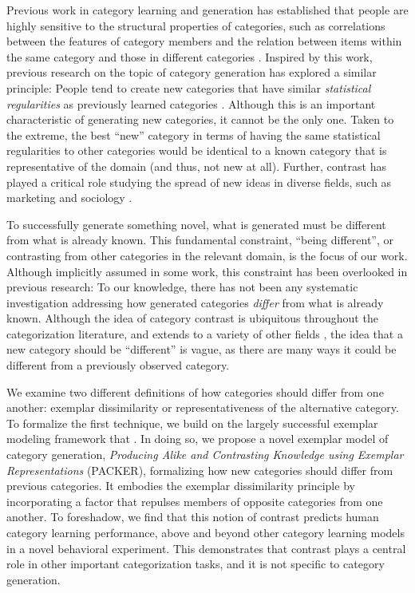 \documentclass[12pt]{article}
\begin{document}
\begin{flushleft}
Previous work in category learning and generation has established that people
are highly sensitive to the structural properties of categories, such as
correlations between the features of category members and the relation between
items within the same category and those in different categories
\citep{roschmervis1975,regier2007,shepard1961learning,smith1995creative}.
Inspired by this work, previous research on the topic of category generation has
explored a similar principle: People tend to create new categories that have
similar {\em statistical regularities} as previously learned categories
\citep{jern2013probabilistic,ward1994structured}. Although this is an important
characteristic of generating new categories, it cannot be the only one. Taken to
the extreme, the best ``new'' category in terms of having the same statistical
regularities to other categories would be identical to a known category that is
representative of the domain (and thus, not new at all). Further, contrast has played a critical role studying the spread of new ideas in diverse fields, such as marketing \citep{berger16} and sociology \citep{rogers03}.

To successfully generate something novel, what is generated must be different
from what is already known. This fundamental constraint, ``being different'', or
contrasting from other categories in the relevant domain, is the focus of our
work. Although implicitly assumed in some work, this constraint has been
overlooked in previous research: To our knowledge, there has not been any
systematic investigation addressing how generated categories {\em differ} from
what is already known. Although the idea of category contrast is ubiquitous
throughout the categorization literature, and extends to a variety of other
fields \citep[e.g., color;][]{regier2007}, the idea that a new category should
be ``different'' is vague, as there are many ways it could be different from a
previously observed category.

We examine two different definitions of how categories should differ from one
another: exemplar dissimilarity or representativeness of the alternative
category. To formalize the first technique, we build on the largely successful
exemplar modeling framework that
\citep{medin1978context,nosofsky1984choice,nosofsky1986attention}. In doing so,
we propose a novel exemplar model of category generation, {\em Producing Alike
  and Contrasting Knowledge using Exemplar Representations} (PACKER),
formalizing how new categories should differ from previous categories. It
embodies the exemplar dissimilarity principle by incorporating a factor that
repulses members of opposite categories from one another. To foreshadow, we find
that this notion of contrast predicts human category learning performance, above
and beyond other category learning models in a novel behavioral experiment. This
demonstrates that contrast plays a central role in other important
categorization tasks, and it is not specific to category generation.


\end{flushleft}
\end{document}
